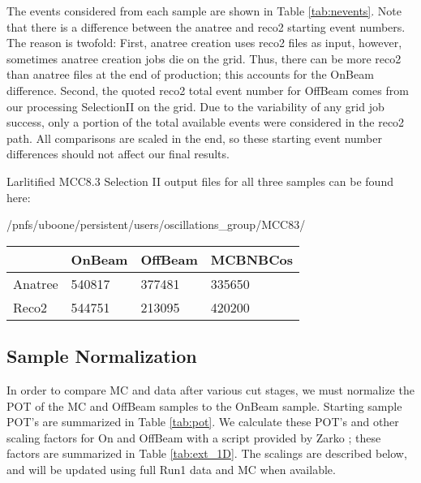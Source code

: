 \documentclass{article}
\begin{document}
\noindent The events considered from each sample are shown in Table \ref{tab:nevents}.  Note that there is a difference between the anatree and reco2 starting event numbers. The reason is twofold: First, anatree creation uses reco2 files as input, however, sometimes anatree creation jobs die on the grid.  Thus, there can be more reco2 than anatree files at the end of production; this accounts for the OnBeam difference. Second, the quoted reco2 total event number for OffBeam comes from our processing SelectionII on the grid. Due to the variability of any grid job success, only a portion of the total available events were considered in the reco2 path. All comparisons are scaled in the end, so these starting event number differences should not affect our final results.

\noindent Larlitified MCC8.3 Selection II output files for all three samples can be found here:
\par /pnfs/uboone/persistent/users/oscillations\_group/MCC83/


\begin{table*} 
 \centering
 \begin{tabular}{| l | l | l | l |}
  \hline
    & OnBeam & OffBeam & MCBNBCos \\ [0.1ex] \hline
Anatree & 540817 & 377481 & 335650 \\ 
Reco2 & 544751 & 213095 & 420200 \\ \hline
 \end{tabular}
\end{table*}


\subsection{Sample Normalization}
In order to compare MC and data after various cut stages, we must normalize the POT of the MC and OffBeam samples to the OnBeam sample. Starting sample POT's are summarized in Table \ref{tab:pot}.  We calculate these POT's and other scaling factors for On and OffBeam with a script provided by Zarko \cite{bib:zarkopot}; these factors are summarized in Table \ref{tab:ext_1D}. The scalings are described below, and will be updated using full Run1 data and MC when available.\\
\end{document}
